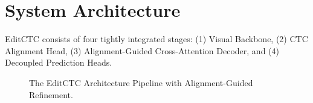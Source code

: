 \section{System Architecture}
\label{sec:architecture}
EditCTC consists of four tightly integrated stages: (1) Visual Backbone, (2) CTC Alignment Head, (3) Alignment-Guided Cross-Attention Decoder, and (4) Decoupled Prediction Heads.

\begin{figure}[htbp]
\centering
{}
\caption{The EditCTC Architecture Pipeline with Alignment-Guided Refinement.}
\label{fig:pipeline}
\end{figure}
